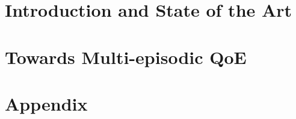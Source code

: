\documentclass[
		openright,titlepage,numbers=noenddot,headinclude,%
                footinclude=true,cleardoublepage=empty,
                BCOR=5mm,paper=a4,fontsize=11pt, %
                ngerman,american, %
                ]{scrreprt}
\begin{document}
\cleardoublepage


\setcounter{page}{1} %
\part{Introduction and State of the Art}\cleardoublepage






\part{Towards Multi-episodic QoE}\cleardoublepage






\setcounter{page}{1}
\part{Appendix}\cleardoublepage



\cleardoublepage %



\end{document}
